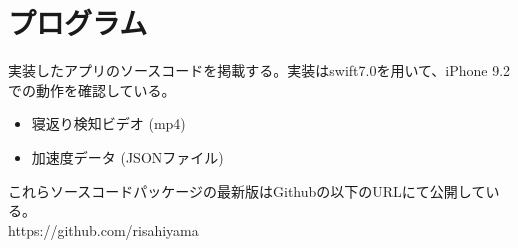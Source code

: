 \chapter{プログラム}
実装したアプリのソースコードを掲載する。実装はswift7.0を用いて、iPhone 9.2での動作を確認している。
\begin{itemize}
\item 寝返り検知ビデオ (mp4)
\item 加速度データ (JSONファイル)
\end{itemize}

これらソースコードパッケージの最新版はGithubの以下のURLにて公開している。 \\
https://github.com/risahiyama